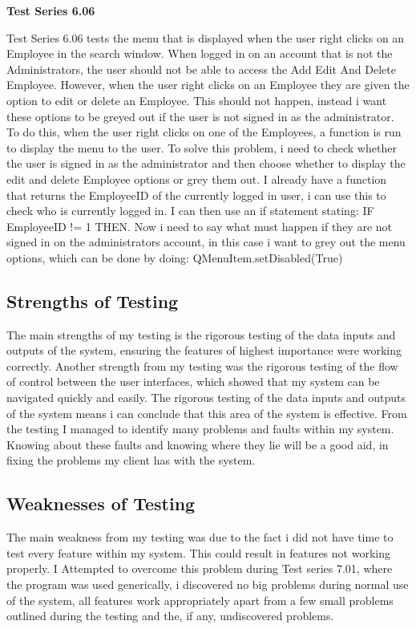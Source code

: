\textbf{Test Series 6.06}

Test Series 6.06 tests the menu that is displayed when the user right clicks on an Employee in the search window. When logged in on an account that is not the Administrators, the user should not be able to access the Add Edit And Delete Employee. However, when the user right clicks on an Employee they are given the option to edit or delete an Employee. This should not happen, instead i want these options to be greyed out if the user is not signed in as the administrator. To do this, when the user right clicks on one of the Employees, a function is run to display the menu to the user. To solve this problem, i need to check whether the user is signed in as the administrator and then choose whether to display the edit and delete Employee options or grey them out. I already have a function that returns the EmployeeID of the currently logged in user, i can use this to check who is currently logged in. I can then use an if statement stating: IF EmployeeID != 1 THEN. Now i need to say what must happen if they are not signed in on the administrators account, in this case i want to grey out the menu options, which can be done by doing: QMenuItem.setDisabled(True)



\subsection{Strengths of Testing}

The main strengths of my testing is the rigorous testing of the data inputs and outputs of the system, ensuring the features of highest importance were working correctly. Another strength from my testing was the rigorous testing of the flow of control between the user interfaces, which showed that my system can be navigated quickly and easily. The rigorous testing of the data inputs and outputs of the system means i can conclude that this area of the system is effective. From the testing I managed to identify many problems and faults within my system. Knowing about these faults and knowing where they lie will be a good aid, in fixing the problems my client has with the system.

\subsection{Weaknesses of Testing}

The main weakness from my testing was due to the fact i did not have time to test every feature within my system. This could result in features not working properly. I Attempted to overcome this problem during Test series 7.01, where the program was used generically, i discovered no big problems during normal use of the system, all features work appropriately apart from a few small problems outlined during the testing and the, if any, undiscovered problems.

